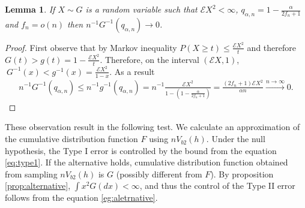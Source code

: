 \documentclass{article} %
\newtheorem{lemma}{Lemma}
\newcommand{\ev}{\mathcal{E}}
\begin{document}
\begin{lemma}
\label{lem:FoverN}
If $X \sim G$ is a random variable such that $\ev X^2 <\infty$, $q_{\alpha,n} = 1-\frac{\alpha}{2f_n+1}$ and $f_n=o(n)$ then $n^{-1} G^{-1}(q_{\alpha,n}) \to 0$.
\end{lemma}  
\begin{proof}
 First observe that by Markov inequality $P(X \geq t) \leq \frac {\ev X^2} {t} $ and therefore $G(t) > g(t) = 1 - \frac {\ev X^2} {t}$.  Therefore, on the interval   $(\ev X,1)$,  $ \ G^{-1}(x) < g^{-1}(x) = \frac{\ev X^2}{1-x}$. As a result 
 \begin{align}
 \label{eg:aletrnative}
 n^{-1} G^{-1}(q_{\alpha,n})  \leq  n^{-1} g^{-1}(q_{\alpha,n})  =n^{-1}  \frac{\ev X^2} { 1 - (1 -\frac {\alpha} {2f_n+1})}= \frac{(2f_n+1) \ev X^2  }{\alpha n} \overset{n \to \infty}{\longrightarrow} 0.
 \end{align} 
\end{proof}
These observation result in the following test. We calculate an approximation of the cumulative distribution function $F$ using $nV_{b2}(h)$. Under the null hypothesis, the Type I error is controlled by the bound from the equation \eqref{eq:type1}. If the alternative holds, cumulative distribution function obtained from sampling $nV_{b2}(h)$ is $G$ (possibly different from $F$). By proposition \ref{prop:alternative}, $\int x^2 G(dx) < \infty$, and thus the control of the Type II error follows from the equation \ref{eg:aletrnative}. 

  
%
%
\end{document}

